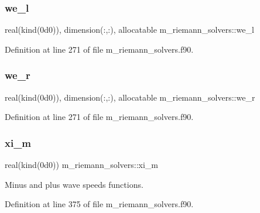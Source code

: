 \subsubsection{\texorpdfstring{we\+\_\+l}{we\_l}}
{\footnotesize\ttfamily real(kind(0d0)), dimension(\+:,\+:), allocatable m\+\_\+riemann\+\_\+solvers\+::we\+\_\+l}



Definition at line 271 of file m\+\_\+riemann\+\_\+solvers.\+f90.

\mbox{\label{namespacem__riemann__solvers_ab9b568d4ea77b665c1f6cea77144acc8}} 
\subsubsection{\texorpdfstring{we\+\_\+r}{we\_r}}
{\footnotesize\ttfamily real(kind(0d0)), dimension(\+:,\+:), allocatable m\+\_\+riemann\+\_\+solvers\+::we\+\_\+r}



Definition at line 271 of file m\+\_\+riemann\+\_\+solvers.\+f90.

\mbox{\label{namespacem__riemann__solvers_a2da04da751b4d4e1e1d8783d80f4ebe1}} 
\subsubsection{\texorpdfstring{xi\+\_\+m}{xi\_m}}
{\footnotesize\ttfamily real(kind(0d0)) m\+\_\+riemann\+\_\+solvers\+::xi\+\_\+m}



Minus and plus wave speeds functions. 



Definition at line 375 of file m\+\_\+riemann\+\_\+solvers.\+f90.

\mbox{\label{namespacem__riemann__solvers_a549a425e9a863451e770d405f092417c}} 
